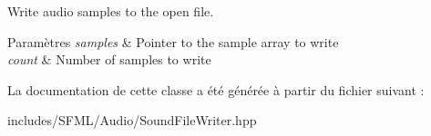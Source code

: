 Write audio samples to the open file. 


\begin{DoxyParams}{Paramètres}
{\em samples} & Pointer to the sample array to write \\
\hline
{\em count} & Number of samples to write \\
\hline
\end{DoxyParams}


La documentation de cette classe a été générée à partir du fichier suivant \+:\begin{DoxyCompactItemize}
\item 
includes/\+S\+F\+M\+L/\+Audio/Sound\+File\+Writer.\+hpp\end{DoxyCompactItemize}
